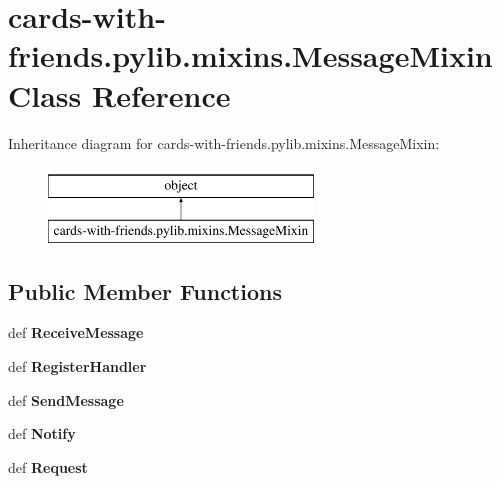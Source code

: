 \hypertarget{classcards-with-friends_1_1pylib_1_1mixins_1_1_message_mixin}{\section{cards-\/with-\/friends.pylib.\-mixins.\-Message\-Mixin Class Reference}
\label{classcards-with-friends_1_1pylib_1_1mixins_1_1_message_mixin}
}
Inheritance diagram for cards-\/with-\/friends.pylib.\-mixins.\-Message\-Mixin\-:\begin{figure}[H]
\begin{center}
\leavevmode
\includegraphics[height=2.000000cm]{classcards-with-friends_1_1pylib_1_1mixins_1_1_message_mixin}
\end{center}
\end{figure}
\subsection*{Public Member Functions}
\begin{DoxyCompactItemize}
\item 
\hypertarget{classcards-with-friends_1_1pylib_1_1mixins_1_1_message_mixin_ae55f0b8f15b7a839bec09f65a5e7b0d4}{def {\bfseries Receive\-Message}}\label{classcards-with-friends_1_1pylib_1_1mixins_1_1_message_mixin_ae55f0b8f15b7a839bec09f65a5e7b0d4}

\item 
\hypertarget{classcards-with-friends_1_1pylib_1_1mixins_1_1_message_mixin_ac62a3243d4de07bad9300b611b070127}{def {\bfseries Register\-Handler}}\label{classcards-with-friends_1_1pylib_1_1mixins_1_1_message_mixin_ac62a3243d4de07bad9300b611b070127}

\item 
\hypertarget{classcards-with-friends_1_1pylib_1_1mixins_1_1_message_mixin_aa0028b347cc219441ccad360781ff4e3}{def {\bfseries Send\-Message}}\label{classcards-with-friends_1_1pylib_1_1mixins_1_1_message_mixin_aa0028b347cc219441ccad360781ff4e3}

\item 
\hypertarget{classcards-with-friends_1_1pylib_1_1mixins_1_1_message_mixin_a12c18674923855655ccafdeb8da6ea46}{def {\bfseries Notify}}\label{classcards-with-friends_1_1pylib_1_1mixins_1_1_message_mixin_a12c18674923855655ccafdeb8da6ea46}

\item 
\hypertarget{classcards-with-friends_1_1pylib_1_1mixins_1_1_message_mixin_a0e4639ef11c326d3dc502a1d3d1a95ab}{def {\bfseries Request}}\label{classcards-with-friends_1_1pylib_1_1mixins_1_1_message_mixin_a0e4639ef11c326d3dc502a1d3d1a95ab}

\end{DoxyCompactItemize}


